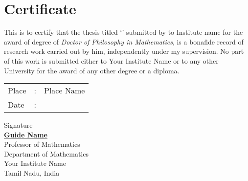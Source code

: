 \chapter*{Certificate}


This is to certify that the thesis titled `\emph{\printtitle}' submitted by  to Institute name for the award of degree of \emph{Doctor of Philosophy in Mathematics}, is a bonafide record of research work carried out by him, independently under my supervision. No part of this work is submitted either to Your Institute Name or to any other University for the award of any other degree or a diploma.
 \vspace{3\baselineskip}

\noindent

\begin{minipage}{0.46\textwidth}
	\raggedright 
	\begin{tabular}{lll}
		Place& :&  Place Name\\
		Date & :&  \underline{\hspace{2.5cm}}
	\end{tabular}
\end{minipage}%
\begin{minipage}{0.48\textwidth}
	\begin{center} 
		Signature\\[3\baselineskip]
		\href{reference Url}{\bfseries  Guide Name}\\
		Professor of Mathematics\\
		Department of Mathematics\\
		Your Institute Name\\
		Tamil Nadu, India	
	\end{center}
\end{minipage}


